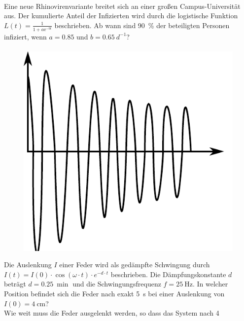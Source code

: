 \documentclass[paper=A4, pagesize, DIV=calc, smallheadings,
fontsize=12pt, expansion=false]{scrreprt}
\begin{document}
\paragraph{}
Eine neue Rhinovirenvariante breitet sich an einer großen Campus-Universität aus. Der kumulierte Anteil der 
Infizierten
wird durch die logistische Funktion 
$L(t) = \frac{1}{1 + a \text{e}^{-bt}}$ beschrieben. 
Ab wann sind \SI{90}{\percent} der beteiligten Personen infiziert, wenn $a = 0.85$ und $b = \SI{0.65}{d^{-1}}$?

\paragraph{}
\label{subsec:DampedOsz}
\begin{figure}
  \centering
  \includegraphics[width=\linewidth]{./imgs/dampedOsz.pdf}
\end{figure}
Die Auslenkung $I$ einer Feder wird als gedämpfte Schwingung durch
$I(t) = I(0) \cdot \cos(\omega \cdot t) \cdot e^{-d\cdot t}$ beschrieben.
Die Dämpfungskonstante $d$ beträgt $d = \SI{0.25}{\min}$ und die Schwingungsfrequenz $f = \SI{25}{\text{Hz}}$.
In welcher Position befindet sich die Feder nach exakt \SI{5}{\s}  bei einer Auslenkung von
$I(0) = \SI{4}{\cm}$?\\
Wie weit muss die Feder ausgelenkt werden, so dass das System nach \SI{4}{\min}
\end{document}
